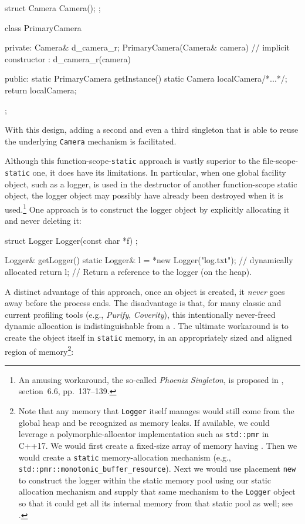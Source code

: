 \begin{emcppshiddenlisting}[emcppsbatch=e11]
struct Camera {
  Camera();
};    
\end{emcppshiddenlisting}
\begin{emcppslisting}[emcppsbatch=e11]
class PrimaryCamera
{
private:
    Camera& d_camera_r;
    PrimaryCamera(Camera& camera)  // implicit constructor
      : d_camera_r(camera) { }  

public:
    static PrimaryCamera getInstance()
    {
        static Camera localCamera{/*...*/};
        return localCamera;
    }
};
\end{emcppslisting}

\noindent With this design, adding a second and even a third singleton that is
able to reuse the underlying \lstinline!Camera! mechanism is facilitated.

Although this function-scope-\lstinline!static! approach is vastly superior
to the file-scope-\lstinline!static! one, it does have its limitations. In
particular, when one global facility object, such as a logger, is used
in the destructor of another function-scope static object, the logger
object may possibly have already been destroyed when it is
used.\footnote{An amusing workaround, the so-called \emph{Phoenix
Singleton}, is proposed in \cite{alexandrescu01}, section~6.6, pp.~137--139.} One approach is to construct the logger object by
explicitly allocating it and never deleting it:

\begin{emcppshiddenlisting}[emcppsbatch={e12,e13,e16,e17}]
struct Logger {
  Logger(const char *f) {}
};
\end{emcppshiddenlisting}
\begin{emcppslisting}[emcppsbatch=e12]
Logger& getLogger()
{
    static Logger& l = *new Logger("log.txt");  // dynamically allocated
    return l;  // Return a reference to the logger (on the heap).
}
\end{emcppslisting}

\noindent A distinct advantage of this approach, once an object is created, it
\emph{never} goes away before the process ends. The disadvantage is
that, for many classic and current profiling tools (e.g., \emph{Purify},
\emph{Coverity}), this intentionally never-freed dynamic allocation is
indistinguishable from a . The ultimate workaround
is to create the object itself in \lstinline!static! memory, in an
appropriately sized and aligned region of memory{\cprotect\footnote{Note
that any memory that \lstinline!Logger! itself manages would still come
from the global heap and be recognized as memory leaks. If available,
we could leverage a polymorphic-allocator implementation such as
\lstinline!std::pmr! in C++17. We would first create a fixed-size array
of memory having . Then we would
create a \lstinline!static! memory-allocation mechanism (e.g.,
\lstinline!std::pmr::monotonic_buffer_resource!). Next we would use
placement \lstinline!new! to construct the logger within the static
memory pool using our static allocation mechanism and supply that same
mechanism to the \lstinline!Logger! object so that it could get all its
  internal memory from that static pool as well; see \cite{lakos22}.}}:

